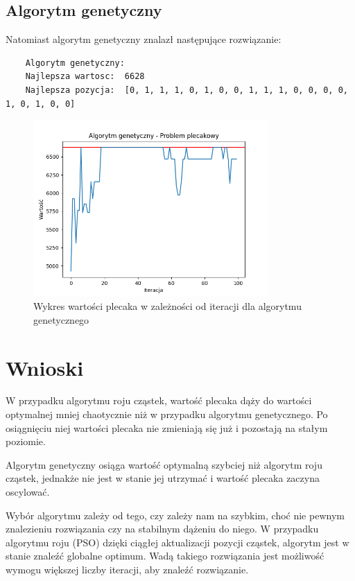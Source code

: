 \documentclass{article}
\begin{document}
\subsection{Algorytm genetyczny}
Natomiast algorytm genetyczny znalazł następujące rozwiązanie:

\begin{lstlisting}
    Algorytm genetyczny:
    Najlepsza wartosc:  6628
    Najlepsza pozycja:  [0, 1, 1, 1, 0, 1, 0, 0, 1, 1, 1, 0, 0, 0, 0, 1, 0, 1, 0, 0]
\end{lstlisting}

\begin{figure}[H]
    \centering
    \includegraphics[width=0.8\textwidth]{ga.png}
    \caption{Wykres wartości plecaka w zależności od iteracji dla algorytmu genetycznego}
\end{figure}

\section{Wnioski}

W przypadku algorytmu roju cząstek, wartość plecaka dąży do wartości optymalnej
mniej chaotycznie niż w przypadku algorytmu genetycznego. Po osiągnięciu niej
wartości plecaka nie zmieniają się już i pozostają na stałym poziomie.

Algorytm genetyczny osiąga wartość optymalną szybciej niż algorytm roju cząstek,
jednakże nie jest w stanie jej utrzymać i wartość plecaka zaczyna oscylować.

Wybór algorytmu zależy od tego, czy zależy nam na szybkim, choć nie pewnym
znalezieniu rozwiązania czy na stabilnym dążeniu do niego. W przypadku algorytmu roju (PSO)
dzięki ciągłej aktualizacji pozycji cząstek, algorytm jest w stanie
znaleźć globalne optimum. Wadą takiego rozwiązania jest
możliwość wymogu większej liczby iteracji, aby znaleźć rozwiązanie.
\end{document}

